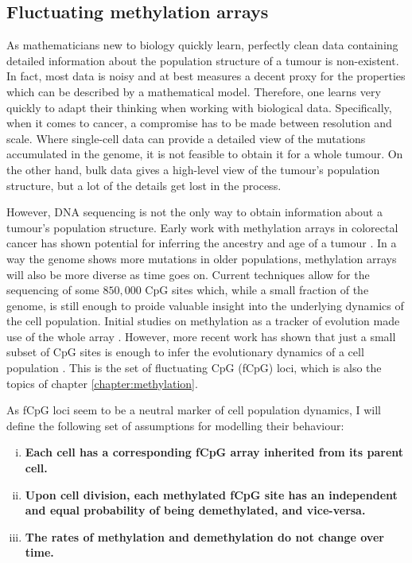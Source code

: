 \subsection{Fluctuating methylation arrays}
As mathematicians new to biology quickly learn, perfectly clean data containing
detailed information about the population structure of a tumour is
non-existent. In fact, most data is noisy and at best measures a decent proxy
for the properties which can be described by a mathematical model. Therefore,
one learns very quickly to adapt their thinking when working with biological
data. Specifically, when it comes to cancer, a compromise has to be made
between resolution and scale. Where single-cell data can provide a detailed
view of the mutations accumulated in the genome, it is not feasible to obtain
it for a whole tumour. On the other hand, bulk data gives a high-level view of
the tumour's population structure, but a lot of the details get lost in the
process. \par
However, DNA sequencing is not the only way to obtain information about a
tumour's population structure. Early work with methylation arrays in colorectal
cancer has shown potential for inferring the ancestry and age of a tumour
\cite{hong_using_2010, siegmund_high_2011}. In a way the genome shows more
mutations in older populations, methylation arrays will also be more diverse as
time goes on. Current techniques allow for the sequencing of some $850,000$ CpG
sites which, while a small fraction of the genome, is still enough to proide
valuable insight into the underlying dynamics of the cell population. Initial
studies on methylation as a tracker of evolution made use of the whole array
\cite{siegmund_modeling_2008, lechevallier_integrating_2010}. However, more
recent work has shown that just a small subset of CpG sites is enough to infer
the evolutionary dynamics of a cell population \cite{gabbutt_fluctuating_2022,
gabbutt_evolutionary_2023}. This is the set of fluctuating CpG (fCpG) loci,
which is also the topics of chapter \ref{chapter:methylation}. \par As fCpG
loci seem to be a neutral marker of cell population dynamics, I will define the
following set of assumptions for modelling their behaviour:

\begin{enumerate}[(i)]
    \item \textbf{Each cell has a corresponding fCpG array inherited from its
        parent cell.}
    \item \textbf{Upon cell division, each methylated fCpG site has an
        independent and equal probability of being demethylated, and
        vice-versa.}
    \item \textbf{The rates of methylation and demethylation do not change over
        time.}
\end{enumerate}

